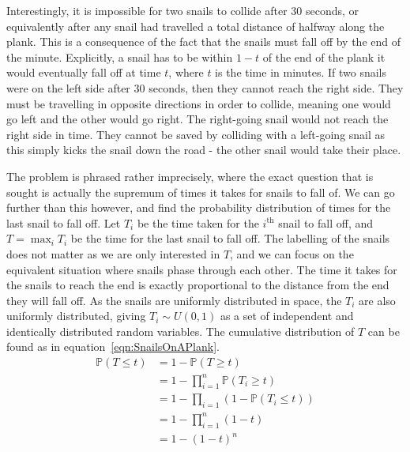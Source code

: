 Interestingly, it is impossible for two snails to collide after 30 seconds, or equivalently after any snail had travelled a total distance of halfway along the plank. This is a consequence of the fact that the snails must fall off by the end of the minute. Explicitly, a snail has to be within $1 - t$ of the end of the plank it would eventually fall off at time $t$, where $t$ is the time in minutes. If two snails were on the left side after 30 seconds, then they cannot reach the right side. They must be travelling in opposite directions in order to collide, meaning one would go left and the other would go right. The right-going snail would not reach the right side in time. They cannot be saved by colliding with a left-going snail as this simply kicks the snail down the road - the other snail would take their place.

The problem is phrased rather imprecisely, where the exact question that is sought is actually the supremum of times it takes for snails to fall of. We can go further than this however, and find the probability distribution of times for the last snail to fall off. Let $T_i$ be the time taken for the $i^\text{th}$ snail to fall off, and $T = \max_i{T_i}$ be the time for the last snail to fall off. The labelling of the snails does not matter as we are only interested in $T$, and we can focus on the equivalent situation where snails phase through each other. The time it takes for the snails to reach the end is exactly proportional to the distance from the end they will fall off. As the snails are uniformly distributed in space, the $T_i$ are also uniformly distributed, giving $T_i \sim U(0, 1)$ as a set of independent and identically distributed random variables. The cumulative distribution of $T$ can be found as in equation~\eqref{eqn:SnailsOnAPlank}.
\begin{align*}
	\mathbb{P}(T \le t) &= 1 - \mathbb{P}(T \ge t)  \\
	&= 1 - \prod_{i=1}^n \mathbb{P}(T_i \ge t)  \\
	&= 1 - \prod_{i=1} \left(1 - \mathbb{P}(T_i \le t)\right)  \\
	&= 1 - \prod_{i=1}^n (1 - t)  \\
	&= 1 - (1 - t)^n
	\label{eqn:SnailsOnAPlank}
\end{align*}